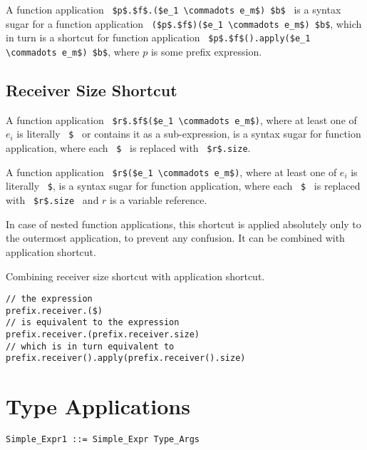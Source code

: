 A function application ~\lstinline!$p$.$f$.($e_1 \commadots e_m$) $b$!~ is a syntax sugar for a function application ~\lstinline!($p$.$f$)($e_1 \commadots e_m$) $b$!, which in turn is a shortcut for function application ~\lstinline!$p$.$f$().apply($e_1 \commadots e_m$) $b$!, where $p$ is some prefix expression. 





\subsection{Receiver Size Shortcut}
\label{sec:receiver-size-shortcut}

A function application ~\lstinline!$r$.$f$($e_1 \commadots e_m$)!, where at least one of $e_i$ is literally ~\lstinline[mathescape=false]!$!~ or contains it as a sub-expression, is a syntax sugar for function application, where each ~\lstinline[mathescape=false]!$!~ is replaced with ~\lstinline!$r$.size!. 

A function application ~\lstinline!$r$($e_1 \commadots e_m$)!, where at least one of $e_i$ is literally ~\lstinline[mathescape=false]!$!, is a syntax sugar for function application, where each ~\lstinline[mathescape=false]!$!~ is replaced with ~\lstinline!$r$.size!~ and $r$ is a variable reference. 

In case of nested function applications, this shortcut is applied absolutely only to the outermost application, to prevent any confusion. It can be combined with application shortcut.

\example Combining receiver size shortcut with application shortcut.
\begin{lstlisting}[mathescape=false]
// the expression
prefix.receiver.($)
// is equivalent to the expression
prefix.receiver.(prefix.receiver.size)
// which is in turn equivalent to
prefix.receiver().apply(prefix.receiver().size)
\end{lstlisting}





\section{Type Applications}
\label{sec:type-applications}

\syntax\begin{lstlisting}
Simple_Expr1 ::= Simple_Expr Type_Args
\end{lstlisting}

